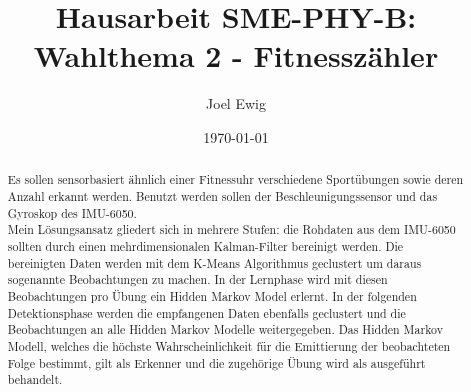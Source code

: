 \documentclass{article}
\begin{document}
\title{Hausarbeit SME-PHY-B: Wahlthema 2 - Fitnesszähler}
\author{Joel Ewig}
\date{\today}
\maketitle
\clearpage

\begin{abstract}
Es sollen sensorbasiert ähnlich einer Fitnessuhr verschiedene Sportübungen sowie deren Anzahl erkannt werden.
Benutzt werden sollen der Beschleunigungssensor und das Gyroskop des IMU-6050.\\
Mein Lösungsansatz gliedert sich in mehrere Stufen:
die Rohdaten aus dem IMU-6050 sollten durch einen mehrdimensionalen Kalman-Filter bereinigt werden.
Die bereinigten Daten werden mit dem K-Means Algorithmus geclustert um daraus sogenannte \glqq{}Beobachtungen\grqq{} zu machen. %
In der Lernphase wird mit diesen Beobachtungen pro Übung ein Hidden Markov Model erlernt.
In der folgenden Detektionsphase werden die empfangenen Daten ebenfalls geclustert und die Beobachtungen an alle Hidden Markov Modelle weitergegeben.
Das Hidden Markov Modell, welches die höchste Wahrscheinlichkeit für die Emittierung der beobachteten Folge bestimmt, gilt als Erkenner und die zugehörige Übung wird als ausgeführt behandelt.
\end{abstract}
\clearpage

\tableofcontents
\clearpage
\end{document}

